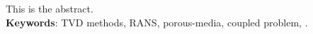 This is the abstract.
\\[\baselineskip]
\textbf{Keywords}: TVD methods, RANS, porous-media, coupled problem, \DUMUX.